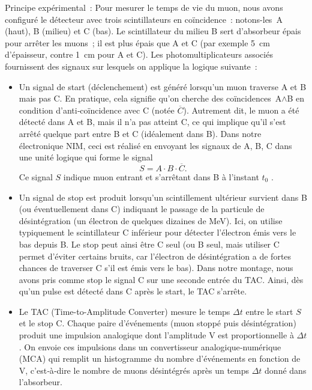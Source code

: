 \documentclass[a4paper,12pt,twoside]{article}
\begin{document}
Principe expérimental~: Pour mesurer le temps de vie du muon, nous avons configuré le détecteur avec trois scintillateurs en coïncidence~: notons-les~A (haut), B (milieu) et C (bas). Le scintillateur du milieu B sert d'absorbeur épais pour arrêter les muons~; il est plus épais que A et C (par exemple 5~cm d'épaisseur, contre 1~cm pour A et C). Les photomultiplicateurs associés fournissent des signaux sur lesquels on applique la logique suivante~:
\begin{itemize}
  \item Un signal de start (déclenchement) est généré lorsqu'un muon traverse A et B mais pas C. En pratique, cela signifie qu'on cherche des coïncidences~A\(\land\)B en condition d'anti‑coïncidence avec C (notée \(\overline{C}\)). Autrement dit, le muon a été détecté dans A et B, mais il n'a pas atteint C, ce qui implique qu'il s'est arrêté quelque part entre B et C (idéalement dans B). Dans notre électronique NIM, ceci est réalisé en envoyant les signaux de A, B, C dans une unité logique qui forme le signal
  \[
    S = A \cdot B \cdot \overline{C}.
  \]
  Ce signal \(S\) indique \og muon entrant et s'arrêtant dans B à l'instant \(t_0\) \fg{}.

  \item Un signal de stop est produit lorsqu'un scintillement ultérieur survient dans B (ou éventuellement dans C) indiquant le passage de la particule de désintégration (un électron de quelques dizaines de MeV). Ici, on utilise typiquement le scintillateur C inférieur pour détecter l'électron émis vers le bas depuis B. Le stop peut ainsi être C seul (ou B seul, mais utiliser C permet d'éviter certains bruits, car l'électron de désintégration a de fortes chances de traverser C s'il est émis vers le bas). Dans notre montage, nous avons pris comme stop le signal C sur une seconde entrée du TAC. Ainsi, dès qu'un pulse est détecté dans C après le start, le TAC s'arrête.

  \item Le TAC (Time-to-Amplitude Converter) mesure le temps \(\Delta t\) entre le start \(S\) et le stop C. Chaque paire d'événements (muon stoppé puis désintégration) produit une impulsion analogique dont l'amplitude V est proportionnelle à \(\Delta t\). On envoie ces impulsions dans un convertisseur analogique‑numérique (MCA) qui remplit un histogramme du nombre d’événements en fonction de V, c'est‑à‑dire le nombre de muons désintégrés après un temps \(\Delta t\) donné dans l'absorbeur.
\end{itemize}
\end{document}

